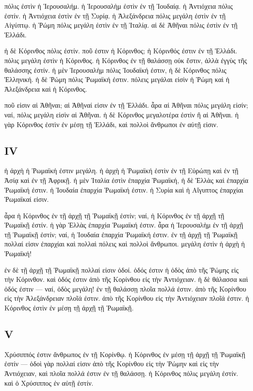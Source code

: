 \documentclass[a4paper]{report}
\begin{document}
πόλις ἐστὶν ἡ Ἱερουσαλήμ. ἡ Ἱερουσαλὴμ ἐστὶν ἐν τῇ Ἰουδαίᾳ. ἡ Ἀντιόχεια
πόλις ἐστίν. ἡ Ἀντιόχεια ἐστὶν ἐν τῇ Συρίᾳ. ἡ Ἀλεξάνδρεια πόλις μεγάλη
ἐστὶν ἐν τῇ Αἰγύπτῳ. ἡ Ῥώμη πόλις μεγάλη ἐστὶν ἐν τῇ Ἰταλίᾳ. αἱ δὲ
Ἀθῆναι πόλις ἐστὶν ἐν τῇ Ἑλλάδι.

ἡ δὲ Κόρινθος πόλις ἐστίν. ποῦ ἐστιν ἡ Κόρινθος; ἡ Κόρινθός ἐστιν ἐν τῇ
Ἑλλάδι. πόλις μεγάλη ἐστὶν ἡ Κόρινθος. ἡ Κόρινθος ἐν τῇ θαλάσσῃ οὐκ
ἔστιν, ἀλλὰ ἐγγὺς τῆς θαλάσσης ἐστίν. ἡ μὲν Ἱερουσαλὴμ πόλις Ἰουδαϊκή
ἐστιν, ἡ δὲ Κόρινθος πόλις Ἑλληνική. ἡ δὲ Ῥώμη πόλις Ῥωμαϊκή ἐστιν.
πόλεις μεγάλαι εἰσὶν ἡ Ῥώμη καὶ ἡ Ἀλεξάνδρεια καὶ ἡ Κόρινθος.

ποῦ εἰσιν αἱ Ἀθῆναι; αἱ Ἀθῆναί εἰσιν ἐν τῇ Ἑλλάδι. ἆρα αἱ Ἀθῆναι πόλις
μεγάλη εἰσίν; ναί, πόλις μεγάλη εἰσὶν αἱ Ἀθῆναι. ἡ δὲ Κόρινθος
μεγαλοτέρα ἐστὶν ἢ αἱ Ἀθῆναι. ἡ γὰρ Κόρινθος ἐστὶν ἐν μέσῃ τῇ Ἑλλάδι,
καὶ πολλοὶ ἄνθρωποι ἐν αὐτῇ εἰσιν.

\subsection{ΙV}\label{ux3b9v}

ἡ ἀρχὴ ἡ Ῥωμαϊκή ἐστιν μεγάλη. ἡ ἀρχὴ ἡ Ῥωμαϊκή ἐστὶν ἐν τῇ Εὐρώπῃ καὶ
ἐν τῇ Ἀσίᾳ καὶ ἐν τῇ Ἀφρικῇ. ἡ μὲν Ἰταλία ἐστὶν ἐπαρχία Ῥωμαϊκή, ἡ δὲ
Ἑλλὰς καὶ ἐπαρχία Ῥωμαϊκή ἐστιν. ἡ Ἰουδαία ἐπαρχία Ῥωμαϊκή ἐστιν. ἡ
Συρία καὶ ἡ Αἴγυπτος ἐπαρχίαι Ῥωμαϊκαί εἰσιν.

ἆρα ἡ Κόρινθος ἐν τῇ ἀρχῇ τῇ Ῥωμαϊκῇ ἐστίν; ναί, ἡ Κόρινθος ἐν τῇ ἀρχῇ
τῇ Ῥωμαϊκῇ ἐστίν. ἡ γὰρ Ἑλλὰς ἐπαρχία Ῥωμαϊκή ἐστιν. ἆρα ἡ Ἱερουσαλὴμ ἐν
τῇ ἀρχῇ τῇ Ῥωμαϊκῇ ἐστίν; ναί, ἡ Ἰουδαία ἐπαρχία Ῥωμαϊκή ἐστιν. ἐν τῇ
ἀρχῇ τῇ Ῥωμαϊκῇ πολλαί εἰσιν ἐπαρχίαι καὶ πολλαὶ πόλεις καὶ πολλοὶ
ἄνθρωποι. μεγάλη ἐστὶν ἡ ἀρχὴ ἡ Ῥωμαϊκή!

ἐν δὲ τῇ ἀρχῇ τῇ Ῥωμαϊκῇ πολλαί εἰσιν ὁδοί. ὁδός ἐστιν ἡ ὁδὸς ἀπὸ τῆς
Ῥώμης εἰς τὴν Κόρινθον. καὶ ὁδός ἐστιν ἀπὸ τῆς Κορίνθου εἰς τὴν
Ἀντιόχειαν. ἡ δὲ θάλασσα καὶ ὁδός ἐστιν --- ναί, ὁδὸς μεγάλη! ἐν τῇ
θαλάσσῃ πλοῖα πολλά ἐστιν. ἀπὸ τῆς Κορίνθου εἰς τὴν Ἀλεξάνδρειαν πλοῖά
ἐστιν. ἀπὸ τῆς Κορίνθου εἰς τὴν Ἀντιόχειαν πλοῖά ἐστιν. ἡ Κόρινθος ἐστὶν
ἐν μέσῃ τῇ ἀρχῇ τῇ Ῥωμαϊκῇ.

\subsection{V}\label{v}

Χρύσιππός ἐστιν ἄνθρωπος ἐν τῇ Κορίνθῳ. ἡ Κόρινθος ἐν μέσῃ τῇ ἀρχῇ τῇ
Ῥωμαϊκῇ ἐστίν --- ὁδοὶ γὰρ πολλαί εἰσιν ἀπὸ τῆς Κορίνθου εἰς τὴν Ῥώμην
καὶ εἰς τὴν Ἀντιόχειαν, καὶ πλοῖα πολλά ἐστιν ἐν τῇ θαλάσσῃ. ἡ Κόρινθος
πόλις μεγάλη ἐστίν. καὶ ὁ Χρύσιππος ἐν αὐτῇ ἐστίν.
\end{document}
